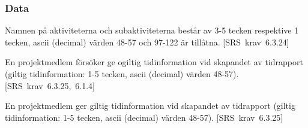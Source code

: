 \documentclass[a4paper]{article}
\def\reqinside{\hfil\penalty 100 \hfilneg \hbox}
\def \req [#1]{\reqinside{[SRS krav #1]}}
\begin{document}
\begin{appendices}
\begin{FT}








\end{FT}


\subsubsection{Data}

\begin{FT}

\item
Namnen på aktiviteterna och subaktiviteterna består av 3-5 tecken respektive 1 tecken,
ascii (decimal) värden 48-57 och 97-122 är tillåtna. \req[6.3.24]

\item
En projektmedlem försöker ge ogiltig tidinformation vid skapandet av tidrapport (giltig tidinformation: 1-5 tecken, ascii (decimal) värden 48-57). \req[6.3.25, 6.1.4]

\item
En projektmedlem ger giltig tidinformation vid skapandet av tidrapport (giltig tidinformation: 1-5 tecken, ascii (decimal) värden 48-57). \req[6.3.25]


\end{FT}
\end{appendices}
\end{document}
